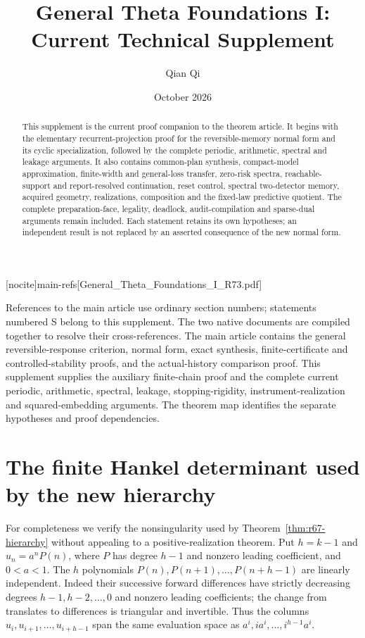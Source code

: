 
[nocite]{main-refs}[General_Theta_Foundations_I_R73.pdf]
\renewcommand{\thesection}{S\arabic{section}}
\title[Current technical supplement]{General Theta Foundations I:\\Current Technical Supplement}
\author{Qian Qi}\date{October 2026}

\begin{abstract}
This supplement is the current proof companion to the theorem article. It begins with the elementary recurrent-projection proof for the reversible-memory normal form and its cyclic specialization, followed by the complete periodic, arithmetic, spectral and leakage arguments. It also contains common-plan synthesis, compact-model approximation, finite-width and general-loss transfer, zero-risk spectra, reachable-support and report-resolved continuation, reset control, spectral two-detector memory, acquired geometry, realizations, composition and the fixed-law predictive quotient. The complete preparation-face, legality, deadlock, audit-compilation and sparse-dual arguments remain included. Each statement retains its own hypotheses; an independent result is not replaced by an asserted consequence of the new normal form.
\end{abstract}
\maketitle
\enlargethispage{3pt}
\noindent References to the main article use ordinary section numbers; statements numbered S belong to this supplement. The two native documents are compiled together to resolve their cross-references. The main article contains the general reversible-response criterion, normal form, exact synthesis, finite-certificate and controlled-stability proofs, and the actual-history comparison proof. This supplement supplies the auxiliary finite-chain proof and the complete current periodic, arithmetic, spectral, leakage, stopping-rigidity, instrument-realization and squared-embedding arguments. The theorem map identifies the separate hypotheses and proof dependencies.





\section{The finite Hankel determinant used by the new hierarchy}\label{sec:r67-determinant}
For completeness we verify the nonsingularity used by Theorem~\ref{thm:r67-hierarchy} without appealing to a positive-realization theorem. Put $h=k-1$ and $u_n=a^nP(n)$, where $P$ has degree $h-1$ and nonzero leading coefficient, and $0<a<1$. The $h$ polynomials $P(n),P(n+1),\ldots,P(n+h-1)$ are linearly independent. Indeed their successive forward differences have strictly decreasing degrees $h-1,h-2,\ldots,0$ and nonzero leading coefficients; the change from translates to differences is triangular and invertible. Thus the columns $u_i,u_{i+1},\ldots,u_{i+h-1}$ span the same evaluation space as $a^i,i a^i,\ldots,i^{h-1}a^i$.


